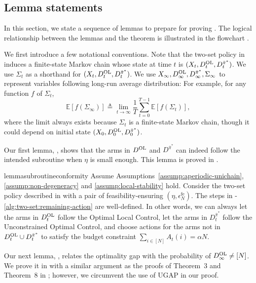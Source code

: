 \documentclass[11pt,letterpaper]{article}
\theoremstyle{plain}
\theoremstyle{definition}
\theoremstyle{remark}
\newcommand{\E}[1]{\mathbb{E}\left[#1\right]}
\newcommand{\sumN}{\sum_{i\in[N]}}
\newcommand{\btotal}{\alpha N}
\newcommand{\pibar}{{\sysbar{\pi}}}
\newcommand{\pibs}{{\pibar^*}}
\newcommand{\sysbar}[1]{\bar{#1}}
\newcommand{\errfe}{\epsilon_N^{\text{fe}}}
\newcommand{\Da}{D^{\pibs}}
\newcommand{\Db}{D^{\textup{OL}}}
\newcommand{\Fullstate}{\Sigma}
\begin{document}
\subsection{Lemma statements}\label{sec:two-set:lemmas}
In this section, we state a sequence of lemmas to prepare for proving . The logical relationship between the lemmas and the theorem is illustrated in the flowchart . 

We first introduce a few notational conventions. 
Note that the two-set policy in  induces a finite-state Markov chain whose state at time $t$ is $(X_t, \Db_t, \Da_t)$. We use $\Fullstate_t$ as a shorthand for $(X_t, \Db_t, \Da_t)$. 
We use $X_\infty, \Db_\infty, \Da_\infty, \Fullstate_\infty$ to represent variables following long-run average distribution: For example, for any function $f$ of $\Fullstate_t$, 
\[
    \E{f(\Fullstate_\infty)} \triangleq \lim_{t\to\infty} \frac{1}{T}\sum_{t=0}^{T-1} \E{f(\Fullstate_t)},
\]
where the limit always exists because $\Fullstate_t$ is a finite-state Markov chain, though it could depend on initial state $(X_0, \Db_0, \Da_0)$. 


Our first lemma, , shows that the arms in $\Db$ and $\Da$ can indeed follow the intended subroutine when $\eta$ is small enough. This lemma is proved in . 



\begin{restatable}{lemma}{subroutineconformity}\label{lem:two-set:subroutine-conform}
    Assume Assumptions~\ref{assump:aperiodic-unichain}, \ref{assump:non-degeneracy} and \ref{assump:local-stability} hold. 
    Consider the two-set policy described in  with a pair of feasibility-ensuring $(\eta, \errfe)$. 
    The steps in -\ref{alg:two-set:remaining-action} are well-defined. In other words, we can always let the arms in $\Db_t$ follow the Optimal Local Control, let the arms in $\Da_t$ follow the Unconstrained Optimal Control, and choose actions for the arms not in $\Db_t\cup\Da_t$ to satisfy the budget constraint $\sumN A_t(i) = \btotal$. 
\end{restatable}


Our next lemma, , relates the optimality gap with the probability of $\Db_\infty \neq [N]$.
We prove it in  with a similar argument as the proofs of Theorem~3 and Theorem~8 in \cite{GasGauYan_23_whittles}; however, we circumvent the use of UGAP in our proof. 
\end{document}
